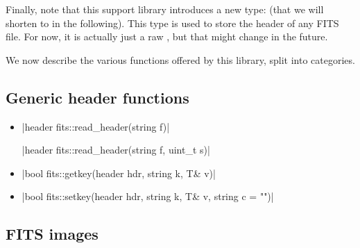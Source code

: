 \documentclass[12pt]{report}
\begin{document}
Finally, note that this support library introduces a new type:  (that we will shorten to  in the following). This type is used to store the header of any FITS file. For now, it is actually just a raw , but that might change in the future.

We now describe the various functions offered by this library, split into categories.

\subsection{Generic header functions}

\begin{itemize}
\item \cppinline|header fits::read_header(string f)| 

\cppinline|header fits::read_header(string f, uint_t s)|

\item \cppinline|bool fits::getkey(header hdr, string k, T& v)| 

\item \cppinline|bool fits::setkey(header hdr, string k, T& v, string c = "")| 


\end{itemize}

\subsection{FITS images}
\end{document}
